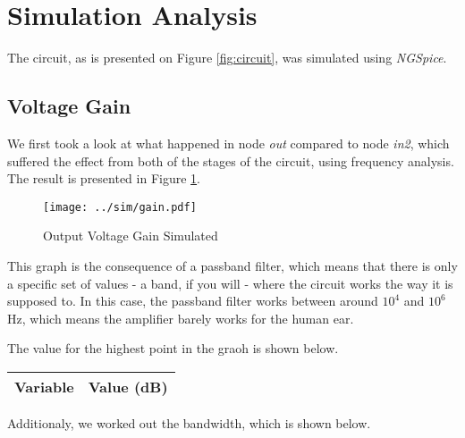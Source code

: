 \clearpage

\section{Simulation Analysis}
\label{sec:simulation}

The circuit, as is presented on Figure \ref{fig:circuit}, was simulated using \textit{NGSpice}.

\vspace{-0.2cm}

\subsection{Voltage Gain}

We first took a look at what happened in node \textit{out} compared to node \textit{in2}, which suffered the effect from both of the stages of the circuit, using frequency analysis. The result is presented in Figure \ref{fig:sim-gain}.

\vspace{-3cm}

\begin{figure}[h] \centering
\texttt{[image: ../sim/gain.pdf]}
\caption{Output Voltage Gain Simulated}
\label{fig:sim-gain}
\end{figure}

This graph is the consequence of a passband filter, which means that there is only a specific set of values - a band, if you will - where the circuit works the way it is supposed to. In this case, the passband filter works between around $10^4$ and $10^6$ Hz, which means the amplifier barely works for the human ear.

The value for the highest point in the graoh is shown below.

\vspace{0.4cm}

\begin{center}
\begin{tabular}{|l|r|}
  \hline    
  {\bf Variable} & {\bf Value (dB)} \\ \hline
  
\end{tabular}
\end{center}

\vspace{0.4cm}

Additionaly, we worked out the bandwidth, which is shown below.

\vspace{0.4cm}

